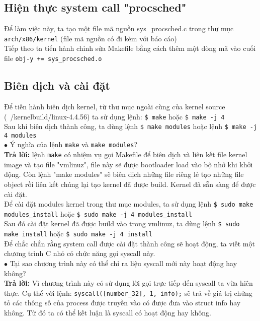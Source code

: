 \documentclass[12pt,a4paper,titlepage]{article}
\begin{document}
	\subsection{Hiện thực system call "procsched"}
	Để làm việc này, ta tạo một file mã nguồn sys\_procsched.c trong
	thư mục \texttt{arch/x86/kernel} (file mã nguồn có đi kèm với báo cáo) \\
	
	Tiếp theo ta tiến hành chỉnh sửa Makefile bằng cách thêm một dòng mã vào cuối
	file \texttt{obj-y += sys\_procsched.o} \\
	
	\subsection{Biên dịch và cài đặt}
	Để tiến hành biên dịch kernel, từ thư mục ngoài cùng của kernel source
	(~/kernelbuild/linux-4.4.56) ta sử dụng lệnh: \texttt{\$ make} hoặc \texttt{\$
		make -j 4} \\
	
	Sau khi biên dịch thành công, ta dùng lệnh \texttt{\$ make modules} hoặc lệnh
	\texttt{\$ make -j 4 modules}\\
	
	$\bullet$ Ý nghĩa của lệnh \texttt{make} và \texttt{make modules}?\\
	\textbf{Trả lời:}
	lệnh \texttt{make} có nhiệm vụ gọi Makefile để biên dịch và liên kết file kernel
	image và tạo file "vmlinuz", file này sẽ được bootloader load vào bộ nhớ khi
	khởi động. Còn lệnh "make modules" sẽ biên dịch những file riêng lẻ tạo những
	file object rồi liên kết chúng lại tạo kernel đã được build. Kernel đã sẵn sàng
	để được cài đặt.\\
	
	Để cài đặt modules kernel trong thư mục modules, ta sử dụng lệnh \texttt{\$ sudo
		make modules\_install} hoặc \texttt{\$ sudo make -j 4 modules\_install} \\
	
	Sau đó cài đặt kernel đã được build vào trong vmlinuz, ta dùng lệnh \texttt{\$
		sudo make install} hoặc \texttt{\$ sudo make -j 4 install}\\
	
	Để chắc chắn rằng system call được cài đặt thành công sẽ hoạt động, ta viết một
	chương trình C nhỏ có chức năng gọi syscall này.\\
	
	$\bullet$ Tại sao chương trình này có thể chỉ ra liệu syscall mới này hoạt động
	hay không? \\
	\textbf{Trả lời:} Vì chương trình này có sử dụng lời gọi trực tiếp đến syscall ta vừa
	hiên thực. Cụ thể với lệnh: \texttt{syscall([number\_32], 1, info);} sẽ trả về
	giá trị chứng tỏ các thông số của process được truyền vào có được đưa vào struct
	info hay không. Từ đó ta có thể kết luận là syscall có hoạt động hay không.\\
	
\end{document}
